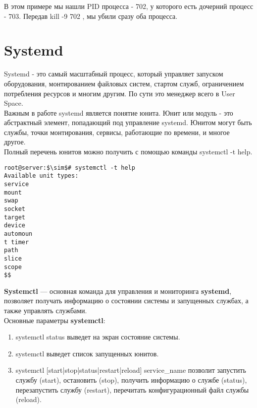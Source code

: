 \documentclass[14pt, a4paper]{article}
\begin{document}
В этом примере мы нашли PID процесса - 702, у которого есть дочерний процесс - 703. Передав \colorbox{backcolour}{kill
-9} 702 , мы убили сразу оба процесса.

\section*{Systemd} 

Systemd - это самый масштабный процесс, который управляет запуском оборудования,
монтированием файловых систем, стартом служб, ограничением потребления ресурсов и многим
другим. По сути это менеджер всего в User Space.\\

Важным в работе systemd является понятие юнита. Юнит или модуль - это абстрактный элемент,
попадающий под управление systemd. Юнитом могут быть службы, точки монтирования, сервисы,
работающие по времени, и многое другое.\\

\noindent Полный перечень юнитов можно получить с помощью команды \colorbox{backcolour}{systemctl -t}
\colorbox{backcolour}{help}.
\vspace{0.3cm}

\begin{lstlisting}
root@server:$\sim$# systemctl -t help
Available unit types:
service
mount
swap
socket
target
device
automoun
t timer
path
slice
scope
$$
\end{lstlisting}
\vspace{0.2cm}

\textbf{Systemctl} — основная команда для управления и мониторинга \textbf{systemd}, позволяет получать
информацию о состоянии системы и запущенных службах, а также управлять службами.\\

Основные параметры \textbf{systemctl}:
\begin{enumerate}
    \item \colorbox{backcolour}{systemctl status} выведет на экран состояние системы.
    \item \colorbox{backcolour}{systemctl} выведет список запущенных юнитов.
    \item \colorbox{backcolour}{systemctl [start|stop|status|restart|reload] service\_name} позволит запустить
    службу (start), остановить (stop), получить информацию о службе (status), перезапустить
    службу (restart), перечитать конфигурационный файл службы (reload).
\end{enumerate}
\end{document}
